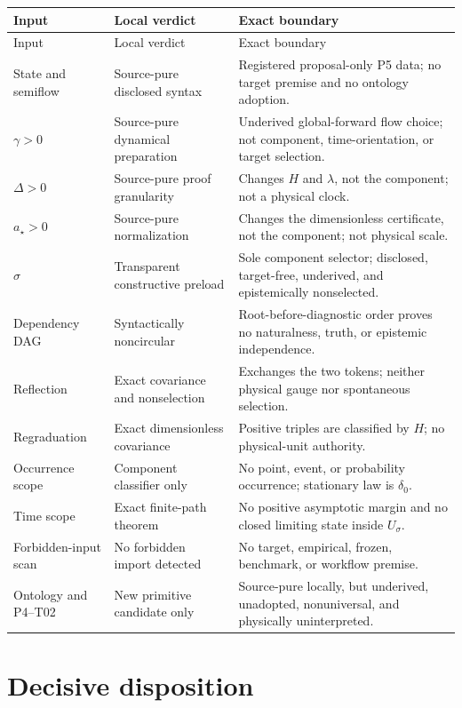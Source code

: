 \documentclass[11pt]{article}
\begin{document}
\begin{longtable}{p{}p{}p{}}
\toprule
Input & Local verdict & Exact boundary \\
\midrule
\endfirsthead
\toprule
Input & Local verdict & Exact boundary \\
\midrule
\endhead
State and semiflow & Source-pure disclosed syntax & Registered proposal-only P5 data; no target premise and no ontology adoption. \\
$\gamma>0$ & Source-pure dynamical preparation & Underived global-forward flow choice; not component, time-orientation, or target selection. \\
$\Delta>0$ & Source-pure proof granularity & Changes $H$ and $\lambda$, not the component; not a physical clock. \\
$a_\star>0$ & Source-pure normalization & Changes the dimensionless certificate, not the component; not physical scale. \\
$\sigma$ & Transparent constructive preload & Sole component selector; disclosed, target-free, underived, and epistemically nonselected. \\
Dependency DAG & Syntactically noncircular & Root-before-diagnostic order proves no naturalness, truth, or epistemic independence. \\
Reflection & Exact covariance and nonselection & Exchanges the two tokens; neither physical gauge nor spontaneous selection. \\
Regraduation & Exact dimensionless covariance & Positive triples are classified by $H$; no physical-unit authority. \\
Occurrence scope & Component classifier only & No point, event, or probability occurrence; stationary law is $\delta_0$. \\
Time scope & Exact finite-path theorem & No positive asymptotic margin and no closed limiting state inside $U_\sigma$. \\
Forbidden-input scan & No forbidden import detected & No target, empirical, frozen, benchmark, or workflow premise. \\
Ontology and P4--T02 & New primitive candidate only & Source-pure locally, but underived, unadopted, nonuniversal, and physically uninterpreted. \\
\bottomrule
\end{longtable}

\section{Decisive disposition}
\end{document}
